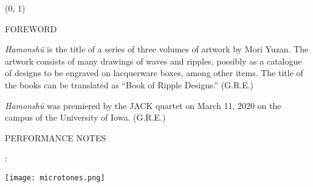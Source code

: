 \documentclass[11pt]{article}
\begin{document}
\begin{textblock}{23}(0, 1)
\begin{center}
\huge FOREWORD
\end{center}
\end{textblock}

\vspace*{0.25\baselineskip}

\begingroup
\begin{center}
\textit{Hamonsh\=u} is the title of a series of three volumes of artwork by Mori Yuzan. The artwork consists of many drawings of waves and ripples, possibly as a catalogue of designs to be engraved on lacquerware boxes, among other items. The title of the books can be translated as ``Book of Ripple Designs.''
\rightskip\leftskip
\phantom{text} \hfill (G.R.E.)
\end{center}
\endgroup

\vspace*{0.25\baselineskip}

\begingroup
\begin{center}
\textit{Hamonsh\=u} was premiered by the JACK quartet on March 11, 2020 on the campus of the University of Iowa.
\rightskip\leftskip
\phantom{text} \hfill (G.R.E.)
\end{center}
\endgroup

\begin{center}
\huge PERFORMANCE NOTES
\end{center}

\begin{center}
:
\end{center}

\begin{center}
\texttt{[image: microtones.png]}
\end{center}
\end{document}

